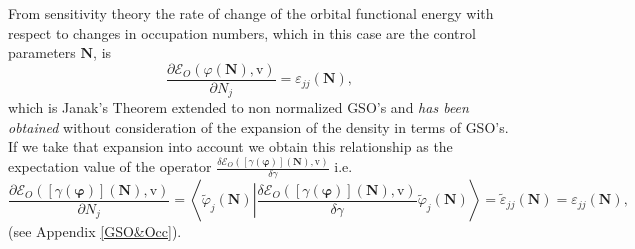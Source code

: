 \documentclass[aps,preprint]{revtex4}%
\begin{document}
From sensitivity theory the rate of change of the orbital functional energy
with respect to changes in occupation numbers, which in this case are the
control parameters $\boldsymbol{N}$, is
\begin{equation}
\frac{\partial\mathcal{E}_{O}\left(  \varphi\boldsymbol{\left(  \boldsymbol{N}%
\right)  },\mathrm{v}\right)  }{\partial N_{j}}=\varepsilon_{jj}\left(
\boldsymbol{N}\right)  , \label{Janak}%
\end{equation}
which is Janak's Theorem extended to non normalized GSO's and \emph{has been
obtained} without consideration of the expansion of the density in terms of
GSO's. If we take that expansion into account we obtain this relationship as
the expectation value of the operator $\frac{\delta\mathcal{E}_{O}\left(
\left[  \gamma\left(  \boldsymbol{\varphi}\right)  \right]
\boldsymbol{\left(  \boldsymbol{N}\right)  ,}\mathrm{v}\right)  }{\delta
\gamma}$ i.e.
\begin{equation}
\frac{\partial\mathcal{E}_{O}\left(  \left[  \gamma\left(  \boldsymbol{\varphi
}\right)  \right]  \boldsymbol{\left(  \boldsymbol{N}\right)  },\mathrm{v}%
\right)  }{\partial N_{j}}=\left\langle \tilde{\varphi}_{j}\left(
\boldsymbol{N}\right)  \left\vert \frac{\delta\mathcal{E}_{O}\left(  \left[
\gamma\left(  \boldsymbol{\varphi}\right)  \right]  \boldsymbol{\left(
\boldsymbol{N}\right)  ,}\mathrm{v}\right)  }{\delta\gamma}\right.
\tilde{\varphi}_{j}\left(  \boldsymbol{N}\right)  \right\rangle =\tilde
{\varepsilon}_{jj}\left(  \boldsymbol{N}\right)  =\varepsilon_{jj}\left(
\boldsymbol{N}\right)  ,
\end{equation}
(see Appendix \ref{GSO&Occ}).
\end{document}
